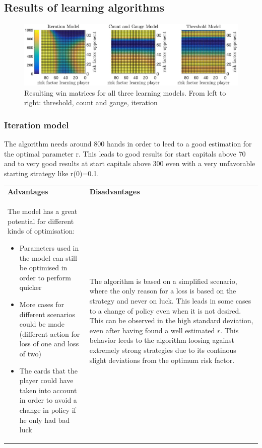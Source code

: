 \documentclass[11pt]{article}
\begin{document}
\subsection{Results of learning algorithms}

\begin{center}
\begin{figure}

\includegraphics[scale=.23]{Graphics/OvViewLatex18}
\caption{Resulting win matrices for all three learning models. From left to right: threshold, count and gauge, iteration}
\label{LearningModelsAllDataOverview}

\end{figure}
\end{center}


\subsubsection{Iteration model}

The algorithm needs around 800 hands in order to leed to a good estimation for the optimal parameter r. This leads to good results for start capitals above 70 and to very good results at start capitals above 300 even with a very unfavorable starting strategy like r(0)=0.1.
\\

\begin{tabular}{ p{7.2cm}  p{7.2cm}}
\textbf{Advantages} & \textbf{Disadvantages}\\
The model has a great potential for different kinds of optimisation:
\begin{itemize}
\item Parameters used in the model can still be optimised in order to perform quicker
\item More cases for different scenarios could be made (different action for loss of one and loss of two)
\item The cards that the player could have taken into account in order to avoid a change in policy if he only had bad luck
\end{itemize}
& The algorithm is based on a simplified scenario, where the only reason for a loss is based on the strategy and never on luck. This leads in some cases to a change of policy even when it is not desired. This can be observed in the high standard deviation, even after having found a well estimated $r$. This behavior leeds to the algorithm loosing against extremely strong strategies due to its continous slight deviations from the optimum risk factor.\\ 
\end{tabular}
\end{document}
